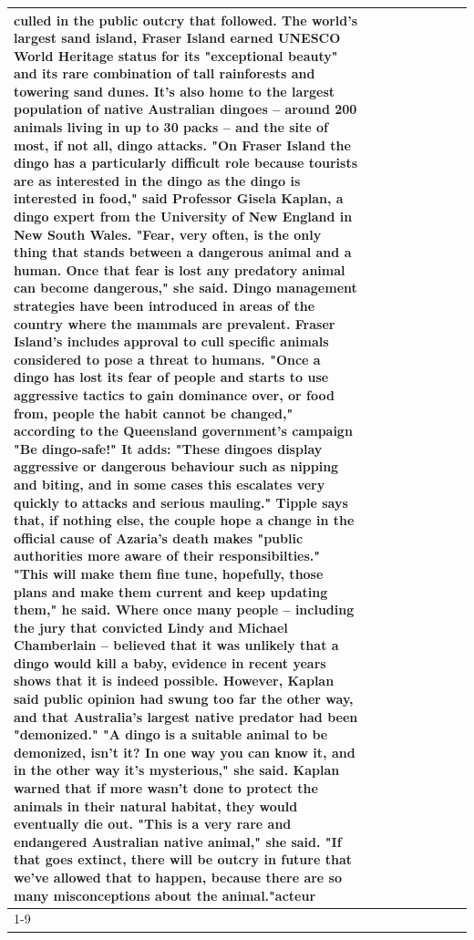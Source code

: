 \begin{table}[H]
\begin{tabular}{lllrlllll}
culled in the public outcry that followed. The world's largest sand island, Fraser Island earned UNESCO World Heritage status for its "exceptional beauty" and its rare combination of tall rainforests and towering sand dunes. It's also home to the largest population of native Australian dingoes -- around 200 animals living in up to 30 packs -- and the site of most, if not all, dingo attacks. "On Fraser Island the dingo has a particularly difficult role because tourists are as interested in the dingo as the dingo is interested in food," said Professor Gisela Kaplan, a dingo expert from the University of New England in New South Wales. "Fear, very often, is the only thing that stands between a dangerous animal and a human. Once that fear is lost any predatory animal can become dangerous," she said. Dingo management strategies have been introduced in areas of the country where the mammals are prevalent. Fraser Island's includes approval to cull specific animals considered to pose a threat to humans. "Once a dingo has lost its fear of people and starts to use aggressive tactics to gain dominance over, or food from, people the habit cannot be changed," according to the Queensland government's campaign "Be dingo-safe!" It adds: "These dingoes display aggressive or dangerous behaviour such as nipping and biting, and in some cases this escalates very quickly to attacks and serious mauling." Tipple says that, if nothing else, the couple hope a change in the official cause of Azaria's death makes "public authorities more aware of their responsibilties." "This will make them fine tune, hopefully, those plans and make them current and keep updating them," he said. Where once many people -- including the jury that convicted Lindy and Michael Chamberlain -- believed that it was unlikely that a dingo would kill a baby, evidence in recent years shows that it is indeed possible. However, Kaplan said public opinion had swung too far the other way, and that Australia's largest native predator had been "demonized." "A dingo is a suitable animal to be demonized, isn't it? In one way you can know it, and in the other way it's mysterious," she said. Kaplan warned that if more wasn't done to protect the animals in their natural habitat, they would eventually die out. "This is a very rare and endangered Australian native animal," she said. "If that goes extinct, there will be outcry in future that we've allowed that to happen, because there are so many misconceptions about the animal."acteur \\
\cline{1-9}

\end{tabular}
\end{table}
